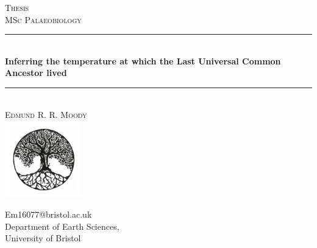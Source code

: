
\begin{titlepage}

  \newcommand{\HRule}{\rule{\linewidth}{0.5mm}} %

  \center %



  \textsc{\Large Thesis}\\[0.5cm] %
  \textsc{\large MSc Palaeobiology}\\[0.5cm] %


  \vspace{1.5 cm}
  \HRule \\[0.4cm]
  { \huge \bfseries Inferring the temperature at which the Last Universal Common Ancestor lived
}\\[0.4cm] %
  \HRule \\[1.5cm]
 

  
  \vspace{.5 cm}
  \large{\textsc{Edmund R. R. Moody}\\}
  \vspace{3 cm}
  \includegraphics[width=0.25\textwidth]{figures/Treeoflife.png}
   \vspace{1 cm}
  
  
  Em16077@bristol.ac.uk\\
  Department of Earth Sciences,\\
  University of Bristol\\
  \vspace{.5 cm}





\vfill %

\end{titlepage}


\newpage